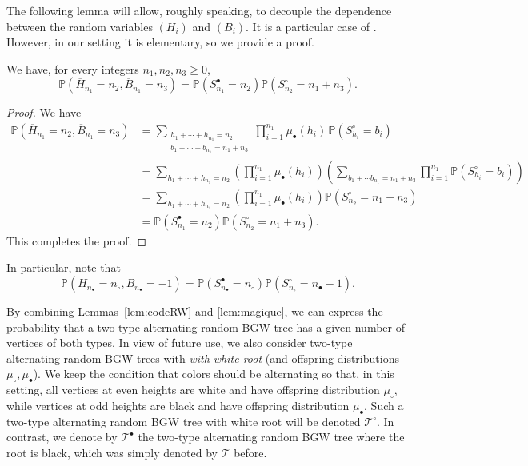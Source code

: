 \documentclass[10pt]{amsart}
\theoremstyle{definition}\newtheorem{defi}[theo]{Definition}\newtheorem{rema}[theo]{Remark}\newtheorem{exam}[theo]{Example}\newtheorem{exem}[theo]{Example}\newtheorem{nota}[theo]{Notation}
\def\mub{\mu_{\bullet}}
\def\muc{\mu_{\circ}}
\def\nc{n_{\circ}}
\def\nb{n_{\bullet}}
\def\oB{\overline{B}}
\def\oH{\overline{H}}
\def \Tsb{\Ts^{\bullet}}
\def \Tsc{\Ts^{\circ}}
\def\Ts{\mathscr{T}}
\renewcommand\Pr[1]{\mathbb{P}\left(#1\right)}
\begin{document}
The following lemma will allow, roughly speaking, to decouple the dependence between the random variables $(H_{i})$ and $(B_{i})$. It is a particular case of \cite[Theorem 1.2]{CL16}. However, in our setting it is elementary, so we provide a proof.

\begin{lemma}\label{lem:magique}
We have, for every integers $n_{1},n_{2},n_{3} \geq 0$,
\[\Pr{\oH_{n_{1}}=n_{2},\oB_{n_{1}}=n_{3}}=\Pr{S^{\bullet}_{n_{1}}=n_{2}} \Pr{S^{\circ}_{n_{2}}=n_{1}+n_{3}}.\]
\end{lemma}

\begin{proof}
We have
\begin{align*}
\Pr{\oH_{n_{1}}=n_{2},\oB_{n_{1}}=n_{3}}&=  \sum_{\substack{h_{1}+ \cdots+h_{n_{1}} =n_{2}  \\ b_{1}+ \cdots +b_{n_{1}} =n_{1}+n_{3} }} \prod_{i=1}^{n_{1}} \mub(h_{i}) \, \Pr{S^{\circ}_{h_{i}} =b_{i}} \\
&=  \sum_{h_{1}+ \cdots+h_{n_{1}} =n_{2}  }    \left( \prod_{i=1}^{n_{1}} \mub(h_{i})  \right) \left( \sum_{ b_{1}+ \cdots b_{n_{1}} =n_{1}+n_{3}}  \prod_{i=1}^{n_{1}}\Pr{S^{\circ}_{h_{i}} =b_{i}}  \right)\\
&= \sum_{h_{1}+ \cdots+h_{n_{1}} =n_{2}}  \left( \prod_{i=1}^{n_{1}} \mub(h_{i}) \right) \Pr{S^{\circ}_{n_{2}}=n_{1}+n_{3}}\\
&=\Pr{S^{\bullet}_{n_{1}}=n_{2}} \Pr{S^{\circ}_{n_{2}}=n_{1}+n_{3}}.
\end{align*}
This completes the proof.
\end{proof}

In particular, note that
\[\Pr{\oH_{\nb}=\nc, \oB_{\nb}=-1}=\Pr{S^{\bullet}_{\nb}=\nc} \Pr{S^{\circ}_{\nc}=\nb-1}.\]

By combining  Lemmas~\ref{lem:codeRW} and \ref{lem:magique}, we can express the probability that a two-type alternating random BGW tree has a given number of vertices of both types.
In view of future use, we also consider two-type alternating random BGW trees
with {\em with white root} (and offspring distributions $\muc,\mub$).
We keep the condition that colors should be alternating so that,
in this setting, all vertices at even heights are white and have offspring distribution $\muc$,
while vertices at odd heights are black and have offspring distribution $\mub$.
Such a two-type alternating random BGW tree with white root will be denoted $\Tsc$.
In contrast, we denote by  $ \Tsb$ the two-type alternating random BGW tree where the root is black,
which was simply denoted by $\Ts$ before.
\end{document}
